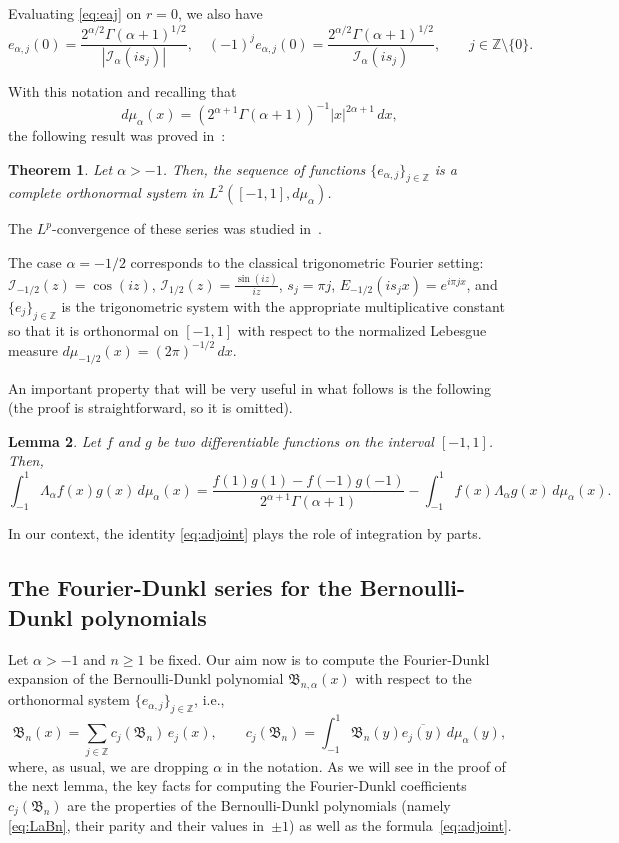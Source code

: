 \documentclass[10pt,a4paper]{article}
\theoremstyle{plain}
\newtheorem{theorem}{Theorem}[section]
\newtheorem{lemma}[theorem]{Lemma}
\theoremstyle{definition}
\numberwithin{equation}{section} %
\newcommand{\La}{\Lambda_{\alpha}}
\newcommand{\mua}{\mu_{\alpha}}
\newcommand{\I}{\mathcal{I}}
\newcommand{\B}{\mathfrak{B}}
\newcommand{\ZZ}{\mathbb{Z}}
\newcommand{\ZZO}{\mathbb{Z} \setminus \{0\}}
\begin{document}
Evaluating \eqref{eq:eaj} on $r=0$, we also have
\[
  e_{\alpha,j}(0) = \frac{2^{\alpha/2}\Gamma(\alpha+1)^{1/2}}{|\I_{\alpha}(is_j)|},
  \quad (-1)^j e_{\alpha,j}(0) = \frac{2^{\alpha/2}\Gamma(\alpha+1)^{1/2}}{\I_{\alpha}(is_j)},
  \qquad j \in \ZZO.
\]

With this notation and recalling that
\[
  d\mua(x) = (2^{\alpha+1}\Gamma(\alpha+1))^{-1}|x|^{2\alpha+1}\, dx,
\]
the following result was proved in~\cite{CV}:

\begin{theorem}
Let $\alpha > -1$. Then, the sequence of functions
$\{e_{\alpha,j}\}_{j\in \ZZ}$
is a complete orthonormal system in $L^2([-1,1],d\mua)$.
\end{theorem}

The $L^p$-convergence of these series was studied in~\cite{CPRV}.

The case $\alpha = -1/2$ corresponds to the classical trigonometric Fourier setting: $\I_{-1/2}(z) = \cos(iz)$, $\I_{1/2}(z) = \frac{\sin(iz)}{iz}$, $s_j = \pi j$, $E_{-1/2}(is_jx) = e^{i\pi jx}$, and $\{e_j\}_{j \in \ZZ}$ is the trigonometric system with the appropriate multiplicative constant so that it is orthonormal on $[-1,1]$ with respect to the normalized Lebesgue measure $d\mu_{-1/2}(x) = (2\pi)^{-1/2}\,dx$.

An important property that will be very useful in what follows is the following (the proof is straightforward, so it is omitted).

\begin{lemma}
Let $f$ and $g$ be two differentiable functions on the interval $[-1,1]$. Then,
\begin{equation}
\label{eq:adjoint}
  \int_{-1}^1 \La f(x) g(x) \,d\mua(x)
  = \frac{f(1)g(1) - f(-1)g(-1)}{2^{\alpha+1}\Gamma(\alpha+1)}
  - \int_{-1}^1 f(x) \La g(x) \,d\mua(x).
\end{equation}
\end{lemma}

In our context, the identity \eqref{eq:adjoint} plays the role of integration by parts.

\subsection{The Fourier-Dunkl series for the Bernoulli-Dunkl polynomials}

Let $\alpha > -1$ and $n\ge 1$ be fixed. Our aim now is to compute the Fourier-Dunkl expansion of the Bernoulli-Dunkl polynomial $\B_{n,\alpha}(x)$ with respect to the orthonormal system $\{e_{\alpha,j}\}_{j \in \ZZ}$, i.e.,
\[
  \B_n(x) = \sum_{j\in \ZZ} c_{j}(\B_n) \, e_j(x),
  \qquad
  c_{j}(\B_n) = \int_{-1}^{1} \B_n(y) \overline{e_j(y)} \,d\mua(y),
\]
where, as usual, we are dropping $\alpha$ in the notation. As we will see in the proof of the next lemma, the key facts for computing the Fourier-Dunkl coefficients $c_{j}(\B_n)$ are the properties of the Bernoulli-Dunkl polynomials (namely \eqref{eq:LaBn}, their parity and their values in~$\pm1$) as well as the formula~\eqref{eq:adjoint}.
\end{document}
